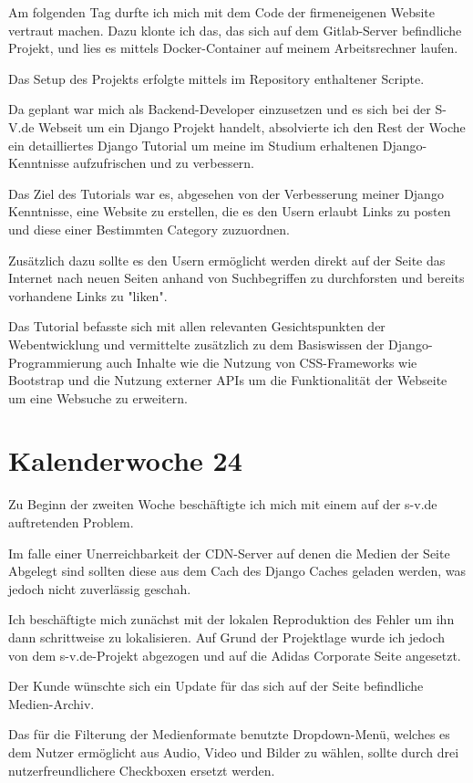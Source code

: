 \documentclass[11pt]{article} %
\begin{document}
Am folgenden Tag durfte ich mich mit dem Code der firmeneigenen Website vertraut machen. Dazu klonte ich das, das sich auf dem Gitlab-Server befindliche Projekt, und lies es mittels Docker-Container auf meinem Arbeitsrechner laufen.

Das Setup des Projekts erfolgte mittels im Repository enthaltener Scripte.

Da geplant war mich als Backend-Developer einzusetzen und es sich bei der S-V.de Webseit um ein Django Projekt handelt, absolvierte ich den Rest der Woche ein detailliertes Django Tutorial um meine im Studium erhaltenen Django-Kenntnisse aufzufrischen und zu verbessern.

Das Ziel des Tutorials war es, abgesehen von der Verbesserung meiner Django Kenntnisse, eine Website zu erstellen, die es den Usern erlaubt Links zu posten und diese einer Bestimmten Category zuzuordnen.

Zusätzlich dazu sollte es den Usern ermöglicht werden direkt auf der Seite das Internet nach neuen Seiten anhand von Suchbegriffen zu durchforsten und bereits vorhandene Links zu "liken".

Das Tutorial befasste sich mit allen relevanten Gesichtspunkten der Webentwicklung und vermittelte zusätzlich zu dem Basiswissen der Django-Programmierung auch Inhalte wie die Nutzung von CSS-Frameworks wie Bootstrap und die Nutzung externer APIs um die Funktionalität der Webseite um eine Websuche zu erweitern. 

\section{Kalenderwoche 24} \label{sec:kw24}

Zu Beginn der zweiten Woche beschäftigte ich mich mit einem auf der s-v.de auftretenden Problem.

Im falle einer Unerreichbarkeit der CDN-Server auf denen die Medien der Seite Abgelegt sind sollten diese aus dem Cach des Django Caches geladen werden, was jedoch nicht zuverlässig geschah.

Ich beschäftigte mich zunächst mit der lokalen Reproduktion des Fehler um ihn dann schrittweise zu lokalisieren.
Auf Grund der Projektlage wurde ich jedoch von dem s-v.de-Projekt abgezogen und auf die Adidas Corporate Seite angesetzt.

Der Kunde wünschte sich ein Update für das sich auf der Seite befindliche Medien-Archiv.

Das für die Filterung der Medienformate benutzte Dropdown-Menü, welches es dem Nutzer ermöglicht aus Audio, Video und Bilder zu wählen, sollte durch drei nutzerfreundlichere Checkboxen ersetzt werden.
\end{document}
